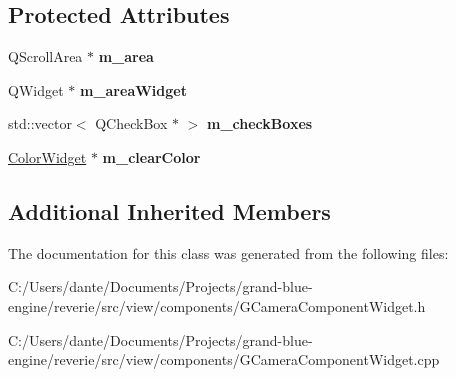 \subsection*{Protected Attributes}
\begin{DoxyCompactItemize}
\item 
\mbox{\label{classrev_1_1_view_1_1_camera_options_widget_a46b8da1d434b09b6b7c35332433bb406}} 
Q\+Scroll\+Area $\ast$ {\bfseries m\+\_\+area}
\item 
\mbox{\label{classrev_1_1_view_1_1_camera_options_widget_a89eec660f92394d534dfef0b65a161c9}} 
Q\+Widget $\ast$ {\bfseries m\+\_\+area\+Widget}
\item 
\mbox{\label{classrev_1_1_view_1_1_camera_options_widget_a7157c118398e71f94eac21ef637f5050}} 
std\+::vector$<$ Q\+Check\+Box $\ast$ $>$ {\bfseries m\+\_\+check\+Boxes}
\item 
\mbox{\label{classrev_1_1_view_1_1_camera_options_widget_a423b65515bd51a6d58e056054f018a63}} 
\mbox{\hyperlink{classrev_1_1_view_1_1_color_widget}{Color\+Widget}} $\ast$ {\bfseries m\+\_\+clear\+Color}
\end{DoxyCompactItemize}
\subsection*{Additional Inherited Members}


The documentation for this class was generated from the following files\+:\begin{DoxyCompactItemize}
\item 
C\+:/\+Users/dante/\+Documents/\+Projects/grand-\/blue-\/engine/reverie/src/view/components/G\+Camera\+Component\+Widget.\+h\item 
C\+:/\+Users/dante/\+Documents/\+Projects/grand-\/blue-\/engine/reverie/src/view/components/G\+Camera\+Component\+Widget.\+cpp\end{DoxyCompactItemize}
